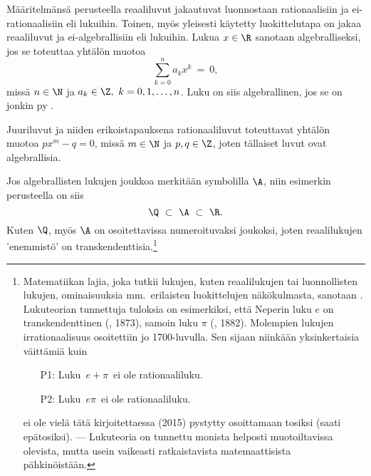 Määritelmänsä perusteella reaaliluvut jakautuvat luonnostaan rationaalisiin ja ei-rationaalisiin
%
eli  lukuihin. Toinen, myös yleisesti käytetty luokittelutapa on jakaa 
reaaliluvut  ja ei-algebrallisiin eli  lukuihin. 
Lukua $x \in \R$ sanotaan algebralliseksi, jos se toteuttaa yhtälön muotoa
\[
\sum_{k=0}^n a_k x^k\ =\ 0,
\]
missä $n \in \N$ ja $a_k \in \Z,\ k = 0,1,\ldots,n$. Luku on siis algebrallinen, jos se on 
jonkin  py .
\begin{Exa} Juuriluvut ja niiden erikoistapauksena rationaaliluvut toteuttavat yhtälön muotoa 
$p x^m - q = 0$, missä $m \in \N$ ja $p,q \in \Z$, joten tällaiset luvut ovat algebrallisia. 
\loppu \end{Exa}
Jos algebrallisten lukujen joukkoa merkitään symbolilla $\A$, niin esimerkin perusteella on siis
\[ 
\Q\ \subset\ \A\ \subset\ \R. 
\]
Kuten $\Q$, myös $\A$ on osoitettavissa numeroituvaksi joukoksi, joten reaalilukujen 'enemmistö'
on transkendenttisia.\footnote[2]{Matematiikan lajia, joka tutkii lukujen, kuten reaalilukujen
tai luonnollisten lukujen, ominaisuuksia mm.\ erilaisten luokittelujen näkökulmasta, sanotaan 
. Lukuteorian tunnettuja tuloksia on esimerkiksi, että Neperin luku $e$ on 
transkendenttinen (, 1873), samoin luku $\pi$ 
(, 1882). Molempien lukujen irrationaalisuus osoitettiin jo 
1700-luvulla. Sen sijaan niinkään yksinkertaisia väittämiä kuin
\begin{itemize}
\item[P1:] Luku $\,e + \pi\,$ ei ole rationaaliluku.
\item[P2:] Luku $\,e \pi\,$ ei ole rationaaliluku.
\end{itemize}
ei ole vielä tätä kirjoitettaessa (2015) pystytty osoittamaan tosiksi (saati epätosiksi). 
--- Lukuteoria on  tunnettu monista helposti muotoiltavissa olevista, mutta usein vaikeasti 
ratkaistavista matemaattisista pähkinöistään.}

\pagebreak

